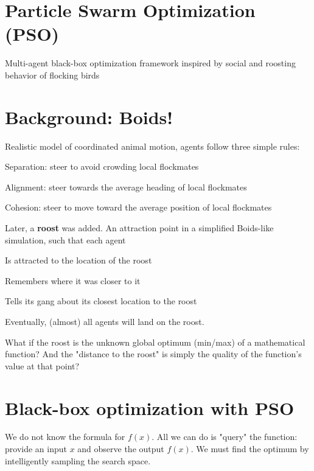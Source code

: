 \section*{Particle Swarm Optimization (PSO)}

Multi-agent black-box optimization framework inspired by
social and roosting behavior of flocking birds

\section*{Background: Boids!}

Realistic model of coordinated animal motion, agents follow three simple rules:
\begin{tightitemize}
    \item Separation: steer to avoid crowding local flockmates
    \item Alignment: steer towards the average heading of local flockmates 
    \item Cohesion: steer to move toward the average position of local flockmates
\end{tightitemize}

Later, a \textbf{roost} was added. An attraction point in a simplified
Boids-like simulation, such that each agent

\begin{tightitemize}
    \item Is attracted to the location of the roost 
    \item Remembers where it was closer to it 
    \item Tells its gang about its closest location to the roost
\end{tightitemize}

Eventually, (almost) all agents will land on the roost.

What if the roost is the unknown global optimum (min/max) of a mathematical 
function? And the "distance to the roost" is simply the quality of the function's value at that point?

\section*{Black-box optimization with PSO}

We do not know the formula for $f(x)$. All we can do is 
"query" the function: provide an input $x$ and observe the output $f(x)$. 
We must find the optimum by intelligently sampling the search space.

